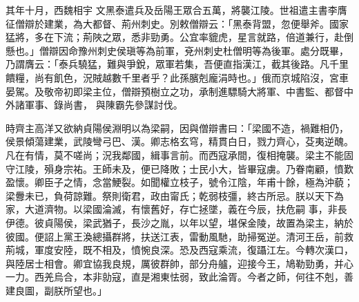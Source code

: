\begin{pinyinscope}
 其年十月，西魏相宇
 文黑泰遣兵及岳陽王眾合五萬，將襲江陵。世祖遣主書李膺征僧辯於建業，為大都督、荊州刺史。別敕僧辯云：「黑泰背盟，忽便舉斧。國家猛將，多在下流；荊陜之眾，悉非勁勇。公宜率貔虎，星言就路，倍道兼行，赴倒懸也。」僧辯因命豫州刺史侯瑱等為前軍，兗州刺史杜僧明等為後軍。處分既畢，乃謂膺云：「泰兵驍猛，難與爭銳，眾軍若集，吾便直指漢江，截其後路。凡千里饋糧，尚有飢色，況賊越數千里者乎？此孫臏剋龐涓時也。」俄而京城陷沒，宮車晏駕。及敬帝初即梁主位，僧辯預樹立之功，承制進驃騎大將軍、中書監、都督中外諸軍事、錄尚書，
 與陳霸先參謀討伐。



 時齊主高洋又欲納貞陽侯淵明以為梁嗣，因與僧辯書曰：「梁國不造，禍難相仍，侯景傾蕩建業，武陵彎弓巴、漢。卿志格玄穹，精貫白日，戮力齊心，芟夷逆醜。凡在有情，莫不嗟尚；況我鄰國，緝事言前。而西寇承間，復相掩襲。梁主不能固守江陵，殞身宗祐。王師未及，便已降敗；士民小大，皆畢寇虜。乃眷南顧，憤歎盈懷。卿臣子之情，念當鯁裂。如聞權立枝子，號令江陰，年甫十餘，極為沖藐；梁釁未已，負荷諒難。祭則衛君，政由甯氏；乾弱枝彊，終古所忌。朕以天下為家，大道濟物。以梁國淪滅，有懷舊好，存亡拯墜，義在今辰，扶危嗣
 事，非長伊德。彼貞陽侯，梁武猶子，長沙之胤，以年以望，堪保金陵，故置為梁主，納於彼國。便詔上黨王渙總攝群將，扶送江表，雷動風馳，助掃冤逆。清河王岳，前救荊城，軍度安陸，既不相及，憤惋良深。恐及西寇乘流，復躡江左。今轉次漢口，與陸居士相會。卿宜協我良規，厲彼群帥，部分舟艫，迎接今王，鳩勒勁勇，并心一力。西羌烏合，本非勍寇，直是湘東怯弱，致此淪胥。今者之師，何往不剋，善建良圖，副朕所望也。」




\end{pinyinscope}
